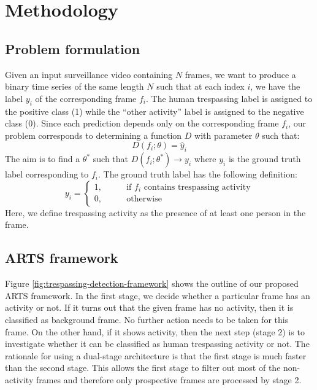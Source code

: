\section{Methodology}
\label{sec:methodology}
\subsection{Problem formulation}
\label{sec:prob-formulation}
Given an input surveillance video containing $N$ frames, we want to produce a binary time series of the same length $N$ such that at each index $i$, we have the label $y_i$ of the corresponding frame $f_i$. The human trespassing label is assigned to the positive class (1) while the ``other activity'' label is assigned to the negative class (0). Since each prediction depends only on the corresponding frame $f_i$, our problem corresponds to determining a function $D$ with parameter $\theta$ such that:
$$ D(f_i;\theta) = \hat{y}_i $$
The aim is to find a $\theta^*$ such that $D(f_i;\theta^*) \rightarrow y_i$ where $y_i$ is the ground truth label corresponding to $f_i$. The ground truth label has the following definition: 
$$y_i=
\begin{cases}
1,  &\qquad \textrm{if } f_i \textrm{ contains trespassing activity} \\ 
0, 	&\qquad \textrm{otherwise}
\end{cases}
$$
Here, we define trespassing activity as the presence of at  least one person in the frame. 

\subsection{ARTS framework}
\label{sec:proposed-framework}
Figure \ref{fig:trespassing-detection-framework} shows the outline of our proposed ARTS framework. In the first stage, we decide whether a particular frame has an activity or not. If it turns out that the given frame has no activity, then it is classified as background frame. No further action needs to be taken for this frame. On the other hand, if it shows activity, then the next step (stage 2) is to investigate whether it can be classified as human trespassing activity or not. The rationale for using a dual-stage architecture is that the first stage is much faster than the second stage. This allows the first stage to filter out most of the non-activity frames and therefore only prospective frames are processed by stage 2.


